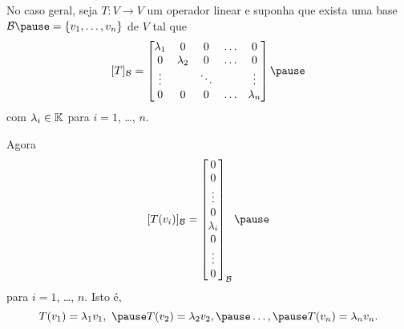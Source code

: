 \documentclass{beamer}
\begin{document}
    \begin{frame}
        No caso geral, \pause seja $T : V \to V$ um operador linear \pause e suponha que exista uma base $\mathcal{B} \pause = \{v_1,\dots,v_n\}$ \pause de $V$ tal que\pause
        \begin{align}\label{formadiagonal}
            [T]_\mathcal{B} = \begin{bmatrix}
                \lambda_1 & 0 & 0 & \dots & 0\\
                0 & \lambda_2 & 0 & \dots & 0\\
                \vdots & & \ddots & & \vdots\\
                0 & 0 & 0 & \dots & \lambda_n
            \end{bmatrix}\pause
        \end{align}
        com $\lambda_i \in \mathbb{K}$ para $i = 1$, \dots, $n$.
    \end{frame}

    \begin{frame}
        Agora\pause
        \[
            [T(v_i)]_\mathcal{B} =
            \begin{bmatrix}
            0\\
            0\\
            \vdots\\
            0\\
            \lambda_i\\
            0\\
            \vdots\\
            0
        \end{bmatrix}_\mathcal{B}\pause
        \]
        para $i = 1$, \dots, $n$. \pause Isto é,\pause
        \[
            T(v_1) = \lambda_1 v_1,\ \pause T(v_2) = \lambda_2 v_2,\pause \dots,\pause  T(v_n) = \lambda_n v_n.
        \]
    \end{frame}
\end{document}
